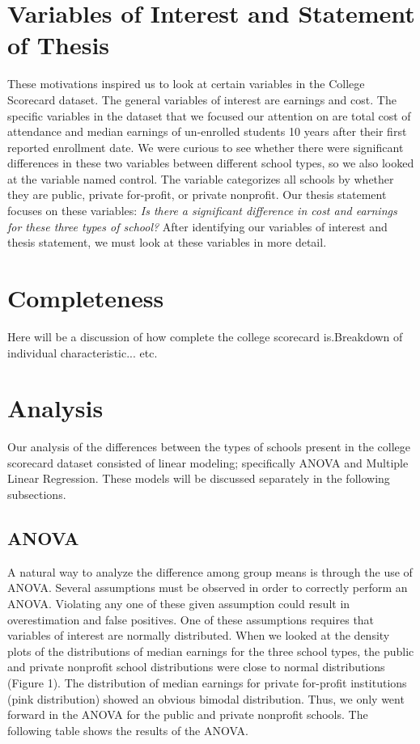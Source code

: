 \documentclass[%
 reprint,
 amsmath,amssymb,
 aps,
]{revtex4-1}
\begin{document}
\section{\label{sec:level1}Variables of Interest and Statement of Thesis}
These motivations inspired us to look at certain variables in the College Scorecard dataset.  The general variables of interest are earnings and cost.  The specific variables in the dataset that we focused our attention on are total cost of attendance and median earnings of un-enrolled students 10 years after their first reported enrollment date.  We were curious to see whether there were significant differences in these two variables between different school types, so we also looked at the variable named control.  The variable categorizes all schools by whether they are public, private for-profit, or private nonprofit. Our thesis statement focuses on these variables: \textit{ Is there a significant difference in cost and earnings for these three types of school?}  After identifying our variables of interest and thesis statement, we must look at these variables in more detail.


\section{\label{sec:level1}Completeness}
Here will be a discussion of how complete the college scorecard is.Breakdown of individual characteristic... etc. 

\section{\label{sec:level1}Analysis}
Our analysis of the differences between the types of schools present in the college scorecard dataset consisted of linear modeling; specifically ANOVA and Multiple Linear Regression.  These models will be discussed separately in the following subsections. 

\subsection{\label{sec:level2}ANOVA}
A natural way to analyze the difference among group means is through the use of ANOVA.  Several assumptions must be observed in order to correctly perform an ANOVA.  Violating any one of these given assumption could result in overestimation and false positives.  One of these assumptions requires that variables of interest are normally distributed.  When we looked at the density plots of the distributions of median earnings for the three school types, the public and private nonprofit school distributions were close to normal distributions (Figure 1).  The distribution of median earnings for private for-profit institutions (pink distribution) showed an obvious bimodal distribution.  Thus, we only went forward in the ANOVA for the public and private nonprofit schools.  The following table shows the results of the ANOVA.
\end{document}
